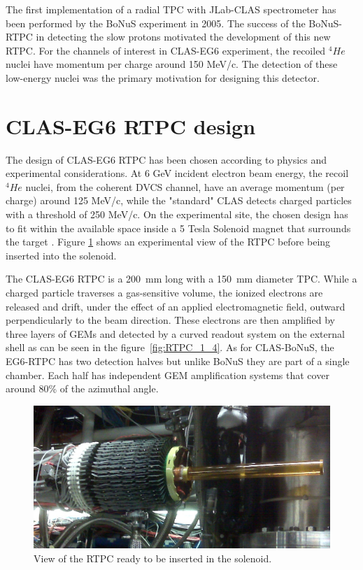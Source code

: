 \documentclass[twocolumn,showpacs,superscriptaddress,groupedaddress]{revtex4}
\begin{document}
The first implementation of a radial TPC with JLab-CLAS spectrometer has been 
performed by the BoNuS experiment \cite{BONUS} in 2005. The success of the 
BoNuS-RTPC in detecting the slow protons motivated the development of this new 
RTPC. For the channels of interest in CLAS-EG6 experiment, the recoiled 
$^{4}He$ nuclei have momentum per charge around 150 MeV/c. The detection of 
these low-energy nuclei was the primary motivation for designing this detector. 

 
\section{CLAS-EG6 RTPC design} \label{sec_design}
The design of CLAS-EG6 RTPC has been chosen according to physics and 
experimental considerations. At 6 GeV incident electron beam energy, the recoil 
$^{4}He$ nuclei, from the coherent DVCS channel, have an average momentum (per 
charge) around 125 MeV/c, while the "standard" CLAS detects charged particles 
with a threshold of 250 MeV/c. On the experimental site, the chosen design has 
to fit within the available space inside a 5 Tesla Solenoid magnet that 
surrounds the target \cite{Hyon-suk}. Figure \ref{fig:RTPC2} shows an 
experimental view of the RTPC before being inserted into the solenoid. 


The CLAS-EG6 RTPC is a 200~mm long with a 150~mm diameter TPC. While a charged 
particle traverses a gas-sensitive volume, the ionized electrons are released 
and drift, under the effect of an applied electromagnetic field, outward 
perpendicularly to the beam direction. These electrons are then amplified by 
three layers of GEMs and detected by a curved readout system on the external 
shell as can be seen in the figure~\ref{fig:RTPC_1_4}. As for CLAS-BoNuS, the 
EG6-RTPC has two detection halves but unlike BoNuS they are part of a single 
chamber. Each half has independent GEM amplification systems that cover around 
80\% of the azimuthal angle.

\begin{figure}[tb]
\centering
\includegraphics[scale=0.19]{fig/RTPC_exp.png}
\caption{View of the RTPC ready to be inserted in the solenoid. } 
\label{fig:RTPC2}
\end{figure}
\end{document}

